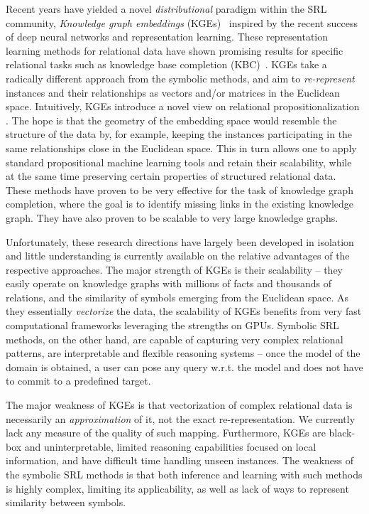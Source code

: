Recent years have yielded a novel \textit{distributional} paradigm within the SRL community, \textit{Knowledge graph embeddings} (KGEs)~\cite{EmbeddingsOverview} inspired by the recent success of deep neural networks and representation learning. 
These representation learning methods for relational data have shown promising results for specific relational tasks such as knowledge base completion (KBC)~\cite{Nickel0TG16}.
KGEs take a radically different approach from the symbolic methods, and aim to \textit{re-represent} instances and their relationships as vectors and/or matrices in the Euclidean space.
Intuitively, KGEs introduce a novel view on relational propositionalization \cite{Kramer2001}.
The hope is that the geometry of the embedding space would resemble the structure of the data by, for example, keeping the instances participating in the same relationships close in the Euclidean space.
This in turn allows one to apply standard propositional machine learning tools and retain their scalability, while at the same time preserving certain properties of structured relational data.
These methods have proven to be very effective for the task of knowledge graph completion, where the goal is to identify missing links in the existing knowledge graph. 
They have also proven to be scalable to very large knowledge graphs.





Unfortunately, these research directions have largely been developed in isolation and little understanding is currently available on the relative advantages of the respective approaches.
The major strength of KGEs is their scalability -- they easily operate on knowledge graphs with millions of facts and thousands of relations, and the similarity of symbols emerging from the Euclidean space.
As they essentially \textit{vectorize} the data, the scalability of KGEs benefits from very fast computational frameworks leveraging the strengths on GPUs.
Symbolic SRL methods, on the other hand, are capable of capturing very complex relational patterns, are interpretable and flexible reasoning systems -- once the model of the domain is obtained, a user can pose any query w.r.t. the model and does not have to commit to a predefined target.



The major weakness of KGEs is that vectorization of complex relational data is necessarily an \textit{approximation} of it, not the exact re-representation.
We currently lack any measure of the quality of such mapping.
Furthermore, KGEs are black-box and uninterpretable, limited reasoning capabilities focused on local information, and have difficult time handling unseen instances.
The weakness of the symbolic SRL methods is that both inference and learning with such methods is highly complex, limiting its applicability, as well as lack of ways to represent similarity between symbols.



